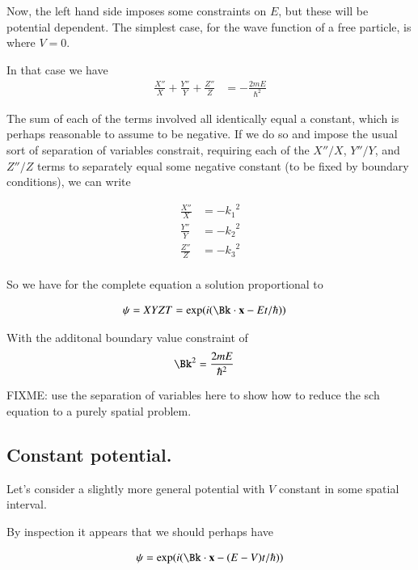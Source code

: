 \documentclass{article}
\begin{document}
Now, the left hand side imposes some constraints on $E$, but these will be potential dependent.
The simplest case, for the wave function of a free particle, is where $V=0$.

In that case we have
\begin{align*}
\frac{X''}{X} +\frac{Y''}{Y} +\frac{Z''}{Z} &= - \frac{2 m E}{\hbar^2}
\end{align*}

The sum of each of the terms involved all identically equal a constant, which is perhaps
reasonable to assume to be negative.  If we do so and impose the usual sort of separation of
variables constrait, requiring each of the $X''/X$, $Y''/Y$, and $Z''/Z$ terms to separately
equal some negative constant (to be fixed by boundary conditions), we can write

\begin{align*}
\frac{X''}{X} &= -{k_1}^2 \\
\frac{Y''}{Y} &= -{k_2}^2 \\
\frac{Z''}{Z} &= -{k_3}^2 \\
\end{align*}

So we have for the complete equation a solution proportional to

\begin{align*}
\psi = X Y Z T &= \exp(i(\Bk \cdot \Bx - E t/\hbar))
\end{align*}

With the additonal boundary value constraint of
\begin{align*}
\Bk^2 &= \frac{2 m E}{\hbar^2}
\end{align*}

FIXME: use the separation of variables here to show how to reduce the sch equation to a purely spatial problem.

\subsection{ Constant potential. }

Let's consider a slightly more general potential with $V$ constant in some spatial interval.

By inspection it appears that we should perhaps have

\begin{align*}
\psi &= \exp(i(\Bk \cdot \Bx - (E - V) t/\hbar)) \\
\end{align*}
\end{document}
